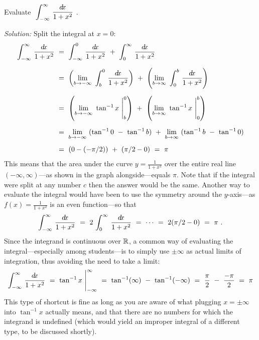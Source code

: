 \begin{exmp}\label{exmp:improper5}
\noindent Evaluate $~\displaystyle\int_{-\infty}^{\infty}\,\frac{d\!x}{1 + x^2}~$.\vspace{1mm}
\par\noindent\emph{Solution:} Split the integral at $x=0$:
\begin{align*}
\int_{-\infty}^{\infty}\,\frac{d\!x}{1 + x^2} ~&=~ \int_{-\infty}^{0}\,\frac{d\!x}{1 + x^2}
 ~+~ \int_{0}^{\infty}\,\frac{d\!x}{1 + x^2}\\[6pt]
&=~ \left(\lim_{b \to -\infty}~\int_{b}^{0}\,\frac{d\!x}{1 + x^2}\right) ~+~
    \left(\lim_{b \to \infty}~\int_{0}^{b}\,\frac{d\!x}{1 + x^2}\right)\\[6pt]
&=~ \left(\lim_{b \to -\infty}~\tan^{-1} x~\Biggr|_b^{0}\right) ~+~
    \left(\lim_{b \to \infty}~\tan^{-1} x~\Biggr|_0^{b}\right)\\[6pt]
&=~ \lim_{b \to -\infty}~ (\tan^{-1} 0 ~-~ \tan^{-1} b) ~+~
    \lim_{b \to \infty}~ (\tan^{-1} b ~-~ \tan^{-1} 0)\\[4pt]
&=~ (0 - (-\pi/2)) ~+~ (\pi/2 - 0) ~=~ \pi
\end{align*}\vspace{-14mm}
\noindent This means that the area under the curve $y=\frac{1}{1+x^2}$ over the
entire real line $(-\infty,\infty)$---as shown in the graph alongside---equals
$\pi$. Note that if the integral were split at any number $c$ then the answer
would be the same. Another way to evaluate the integral would have been to use
the symmetry around the $y$-axis---as $f(x)=\frac{1}{1+x^2}$ is an even
function---so that
\[
\int_{-\infty}^{\infty}\,\frac{d\!x}{1 + x^2} ~=~ 2\,\int_{0}^{\infty}\,\frac{d\!x}{1 + x^2}
~=~ \cdots ~=~ 2 (\pi/2 - 0) ~=~ \pi ~.
\]
Since the integrand is continuous over $\mathbb{R}$, a common way of evaluating the
integral---especially among students---is to simply use $\pm\infty$ as actual
limits of integration, thus avoiding the need to take a limit:
\[
\int_{-\infty}^{\infty}\,\frac{d\!x}{1 + x^2} ~=~ \tan^{-1} x~\Biggr|_{-\infty}^{\infty}
~=~ \tan^{-1} (\infty) ~-~ \tan^{-1} (-\infty) ~=~ \frac{\pi}{2} ~-~ \frac{-\pi}{2}
~=~ \pi
\]
This type of shortcut is fine as long as you are aware of what plugging
$x=\pm\infty$ into $\tan^{-1} x$ actually means, and that there are no numbers
for which the integrand is undefined (which would yield an improper integral of
a different type, to be discussed shortly).
\end{exmp}\vspace{-2mm}
